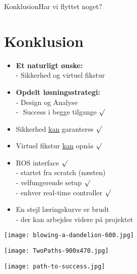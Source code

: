 \begin{frame}{Konklusion}{Har vi flyttet noget?}
\section{Konklusion}
\begin{minipage}{0.6\textwidth}
\begin{block}{}
	\begin{itemize}
		\item \textbf{Et naturligt ønske:}\\ - Sikkerhed og virtuel fikstur
		\item \textbf{Opdelt løsningsstrategi:}\\ - Design og Analyse \\
		\scriptsize -\,\,\,\,Success i begge tilgange $\surd$ 
		\item \normalsize Sikkerhed \underline{kan} garanteres $\surd$
		\item Virtuel fikstur \underline{kan} opnås $\surd$
		\vspace{0.5cm}
		\item \normalsize ROS interface  $\surd$ \\
		\scriptsize - startet fra scratch (næsten) \\
		\scriptsize - velfungerende setup $\surd$ \\
\scriptsize - enhver real-time controller $\surd$ \\
		\item \normalsize En stejl læringskurve er brudt \\ 
		\scriptsize - der kan arbejdes videre på projektet
	\end{itemize}
\end{block}
\end{minipage}
\begin{minipage}{0.35\textwidth}
\texttt{[image: blowing-a-dandelion-600.jpg]}
\vspace*{0.2cm}

\texttt{[image: TwoPaths-900x470.jpg]}
\vspace*{0.2cm}

\texttt{[image: path-to-success.jpg]}
\end{minipage}
\end{frame}

